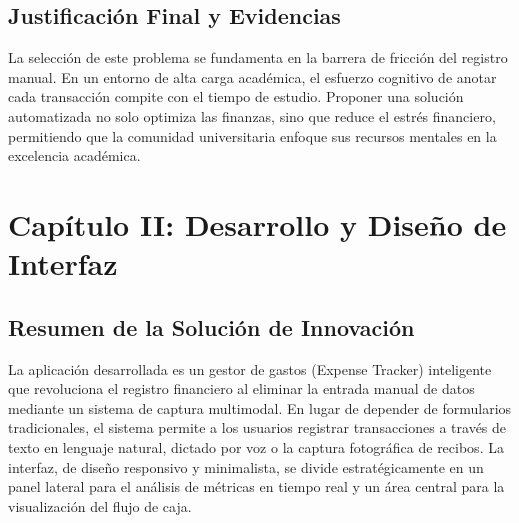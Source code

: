 \documentclass[12pt]{article}
\begin{document}
\subsection{Justificación Final y Evidencias}
La selección de este problema se fundamenta en la barrera de fricción del registro manual. En un entorno de alta carga académica, el esfuerzo cognitivo de anotar cada transacción compite con el tiempo de estudio. Proponer una solución automatizada no solo optimiza las finanzas, sino que reduce el estrés financiero, permitiendo que la comunidad universitaria enfoque sus recursos mentales en la excelencia académica.

\newpage

\section{Capítulo II: Desarrollo y Diseño de Interfaz}

\subsection{Resumen de la Solución de Innovación}
La aplicación desarrollada es un gestor de gastos (Expense Tracker) inteligente que revoluciona el registro financiero al eliminar la entrada manual de datos mediante un sistema de captura multimodal. En lugar de depender de formularios tradicionales, el sistema permite a los usuarios registrar transacciones a través de texto en lenguaje natural, dictado por voz o la captura fotográfica de recibos. La interfaz, de diseño responsivo y minimalista, se divide estratégicamente en un panel lateral para el análisis de métricas en tiempo real y un área central para la visualización del flujo de caja.
\end{document}
